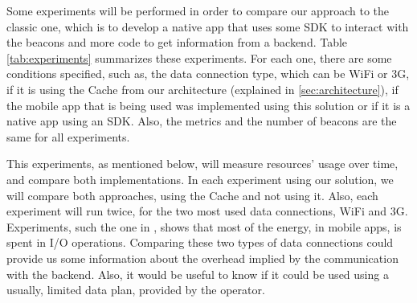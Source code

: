 Some experiments will be performed in order to compare
our approach to the classic one, which is to develop a
native app that uses some SDK to interact with the beacons
and more code to get information from a backend.
Table \ref{tab:experiments} summarizes these experiments.
For each one, there are some conditions specified, such as,
the data connection type, which can be WiFi or 3G, if
it is using the Cache from our architecture (explained in 
\ref{sec:architecture}), if the mobile app that is being
used was implemented using this solution or if it is
a native app using an SDK. 
Also, the metrics and the number of beacons
are the same for all experiments.



This experiments, as mentioned below, 
will measure resources' usage over time, 
and compare both implementations. In each
experiment using our solution, we will
compare both approaches, using the Cache
and not using it. Also, each experiment
will run twice, for the two most used
data connections, WiFi and 3G.
Experiments, such the one
in \cite{Pathak2012}, shows that most of the energy, 
in mobile apps,
is spent in I/O operations.
Comparing these
two types of data connections could provide us
some information about the
overhead implied by the communication with
the backend. Also, it would be useful to
know if it could be used using
a usually, limited data plan, provided by
the operator.

